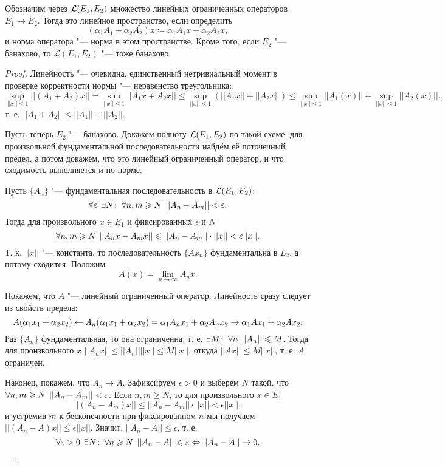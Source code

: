 \documentclass[main]{subfiles}
\begin{document}
\begin{theorem}
  Обозначим через \( \Linears{E_1}[E_2] \)
  множество линейных ограниченных операторов
  \( E_1 \to E_2 \).
  Тогда это линейное пространство, если определить
  \[
    (\alpha_1 A_1 + \alpha_2 A_2) x \coloneqq
    \alpha_1 A_1 x + \alpha_2 A_2 x,
  \]
  и норма оператора "--- норма в этом пространстве.
  Кроме того, если \( E_2 \) "--- банахово, то
  \( \mathcal{L}(E_1, E_2) \) "--- тоже банахово.
\end{theorem}
\begin{proof}
  Линейность "--- очевидна, единственный нетривиальный
  момент в проверке корректности нормы "--- неравенство
  треугольника:
  \[
    \sup_{||x|| \le 1} ||(A_1 + A_2) x|| =
    \sup_{||x|| \le 1} ||A_1 x + A_2 x|| \le
    \sup_{||x|| \le 1} \left( ||A_1 x|| + ||A_2 x|| \right) \le
    \sup_{||x|| \le 1} ||A_1(x)|| + \sup_{||x|| \le 1} ||A_2(x)||,
  \]
  т. е. \( ||A_1 + A_2|| \le ||A_1|| + ||A_2|| \).

  Пусть теперь \( E_2 \) "--- банахово.
  Докажем полноту \( \Linears{E_1}[E_2] \) по такой схеме:
  для произвольной фундаментальной последовательности
  найдём её поточечный предел,
  а потом докажем, что это линейный ограниченный оператор,
  и что сходимость выполняется и по норме.
  
  Пусть \( \{ A_n \} \) "--- фундаментальная последовательность
  в \( \Linears{E_1}[E_2] \):
  \[ \forall {\varepsilon} \; \, \exists N \colon \: \forall {n, m \geqslant N} \; \, ||A_n - A_m|| < \varepsilon. \]
  Тогда для произвольного \( x \in E_1 \)
  и фиксированных \( \epsilon \) и \( N \)
  \[
    \forall {n, m \geqslant N} \; \, ||A_n x - A_m x|| \leqslant ||A_n - A_m|| \cdot ||x|| < \varepsilon ||x||.
  \]
  Т. к. \( ||x|| \) "--- константа, то
  последовательность \( \{ A x_n \} \) фундаментальна в \( L_2 \),
  а потому сходится.
  Положим
  \[ A(x) = \lim_{n \to \infty} A_n x. \]

  Покажем, что \( A \) "--- линейный ограниченный оператор.
  Линейность сразу следует из свойств предела:
  \[
    A(\alpha_1 x_1 + \alpha_2 x_2) \leftarrow
    A_n(\alpha_1 x_1 + \alpha_2 x_2) =
    \alpha_1 A_n x_1 + \alpha_2 A_n x_2 \to
    \alpha_1 A x_1 + \alpha_2 A x_2,
  \]
  Раз \( \{ A_n \} \) фундаментальная, то она ограниченна,
  т. е. \( \exists M \colon \: \forall {n} \; \, ||A_n|| \leqslant M \).
  Тогда для произвольного \( x \)
  \( ||A_n x|| \le ||A_n||||x|| \le M ||x|| \),
  откуда \( ||A x|| \le M ||x|| \),
  т. е. \( A \) ограничен.

  Наконец, покажем, что \( A_n \to A \).
  Зафиксируем \( \epsilon > 0 \) и выберем
  \( N \) такой, что
  \(  \forall {n, m \geqslant N} \; \, ||A_n - A_m|| < \varepsilon \).
  Если \( n, m \ge N \), то для произвольного
  \( x \in E_1 \)
  \[ ||(A_n - A_m) x|| \le ||A_n - A_m|| \cdot ||x|| < \epsilon ||x||, \]
  и устремив \( m \) к бесконечности при
  фиксированном \( n \) мы получаем
  \( ||(A_n - A) x|| \le \epsilon ||x|| \).
  Значит, \( ||A_n - A|| \le \epsilon \),
  т. е.
  \[
    \forall {\varepsilon> 0} \; \,
    \exists N \colon \:
    \forall {n \geqslant N} \; \, ||A_n - A||
    \leqslant \varepsilon
    \Leftrightarrow
    ||A_n - A|| \to 0.
  \]
\end{proof}
\end{document}
